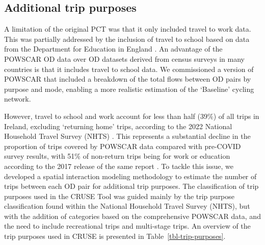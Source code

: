 \documentclass[
  super,
  preprint,
  3p]{elsarticle}
\begin{document}
\subsection{Additional trip purposes}\label{sec-trip-purposes}

A limitation of the original PCT was that it only included travel to
work data. This was partially addressed by the inclusion of travel to
school based on data from the Department for Education in England
\citep{goodman2019}. An advantage of the POWSCAR OD data over OD
datasets derived from census surveys in many countries is that it
includes travel to school data. We commissioned a version of POWSCAR
that included a breakdown of the total flows between OD pairs by purpose
and mode, enabling a more realistic estimation of the `Baseline' cycling
network.

However, travel to school and work account for less than half (39\%) of
all trips in Ireland, excluding `returning home' trips, according to the
2022 National Household Travel Survey (NHTS) \citep{national2022}. This
represents a substantial decline in the proportion of trips covered by
POWSCAR data compared with pre-COVID survey results, with 51\% of
non-return trips being for work or education according to the 2017
release of the same report \citep{national2017}. To tackle this issue,
we developed a spatial interaction modeling methodology to estimate the
number of trips between each OD pair for additional trip purposes. The
classification of trip purposes used in the CRUSE Tool was guided mainly
by the trip purpose classification found within the National Household
Travel Survey (NHTS), but with the addition of categories based on the
comprehensive POWSCAR data, and the need to include recreational trips
and multi-stage trips. An overview of the trip purposes used in CRUSE is
presented in Table~\ref{tbl-trip-purposes}.

\begingroup\fontsize{8}{10}\selectfont
\end{document}
